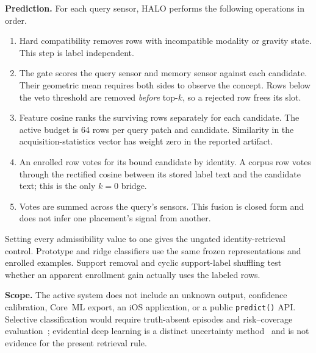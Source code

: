 \textbf{Prediction.} For each query sensor, HALO performs the following operations in order.

\begin{enumerate}
  \item Hard compatibility removes rows with incompatible modality or gravity state. This step is
        label independent.
  \item The gate scores the query sensor and memory sensor against each candidate. Their geometric
        mean requires both sides to observe the concept. Rows below the veto threshold are removed
        \emph{before} top-$k$, so a rejected row frees its slot.
  \item Feature cosine ranks the surviving rows separately for each candidate. The active budget is
        64 rows per query patch and candidate. Similarity in the acquisition-statistics vector has
        weight zero in the reported artifact.
  \item An enrolled row votes for its bound candidate by identity. A corpus row votes through the
        rectified cosine between its stored label text and the candidate text; this is the only
        $k{=}0$ bridge.
  \item Votes are summed across the query's sensors. This fusion is closed form and does not infer
        one placement's signal from another.
\end{enumerate}

Setting every admissibility value to one gives the ungated identity-retrieval control. Prototype and
ridge classifiers use the same frozen representations and enrolled examples. Support removal and
cyclic support-label shuffling test whether an apparent enrollment gain actually uses the labeled
rows.

\textbf{Scope.} The active system does not include an unknown output, confidence calibration,
Core~ML export, an iOS application, or a public \texttt{predict()} API. Selective classification
would require truth-absent episodes and risk--coverage evaluation~\cite{selectiveclass}; evidential
deep learning is a distinct uncertainty method~\cite{edl} and is not evidence for the present
retrieval rule.
